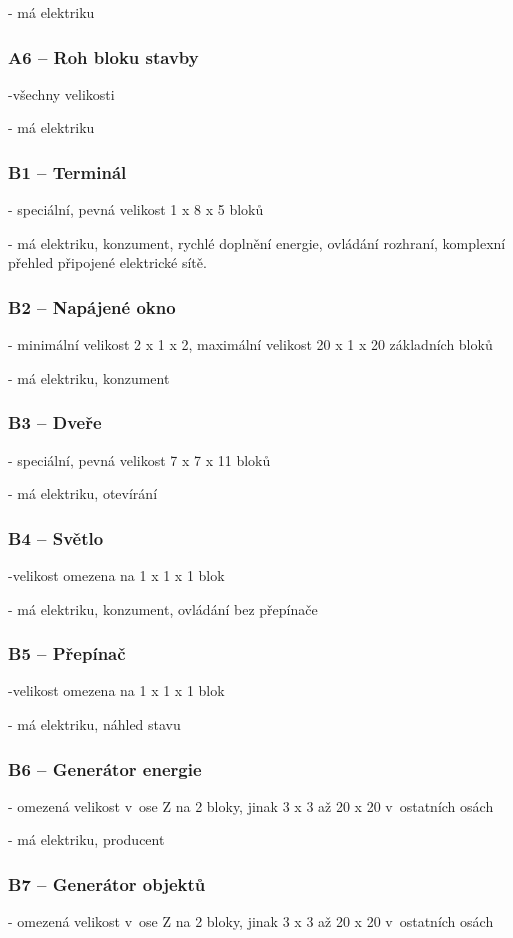 - má elektriku
\subsubsection{A6 -- Roh bloku stavby}
-všechny velikosti

- má elektriku

\subsubsection{B1 -- Terminál}
- speciální, pevná velikost 1 x 8 x 5 bloků

- má elektriku, konzument, rychlé doplnění energie, ovládání rozhraní, komplexní přehled připojené elektrické sítě.
\subsubsection{B2 -- Napájené okno}
- minimální velikost 2 x 1 x 2, maximální velikost 20 x 1 x 20 základních bloků

- má elektriku, konzument
\subsubsection{B3 -- Dveře}
- speciální, pevná velikost 7 x 7 x 11 bloků

- má elektriku, otevírání
\subsubsection{B4 -- Světlo}
-velikost omezena na 1 x 1 x 1 blok

- má elektriku, konzument, ovládání bez přepínače
\subsubsection{B5 -- Přepínač}
-velikost omezena na 1 x 1 x 1 blok

- má elektriku, náhled stavu
\subsubsection{B6 -- Generátor energie}
- omezená velikost v~ose Z na 2 bloky, jinak 3 x 3 až 20 x 20 v~ostatních osách

- má elektriku, producent
\subsubsection{B7 -- Generátor objektů}
- omezená velikost v~ose Z na 2 bloky, jinak 3 x 3 až 20 x 20 v~ostatních osách

